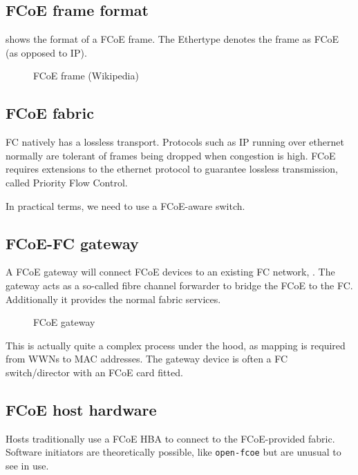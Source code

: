 \subsection{FCoE frame format}\label{fcoe-frame-format}

shows the format of a FCoE frame. The Ethertype denotes the frame as
FCoE (as opposed to IP).

\begin{figure}
\centering
\caption{FCoE frame (Wikipedia){}}
\end{figure}

\subsection{FCoE fabric}\label{fcoe-fabric}

FC natively has a lossless transport. Protocols such as IP running over
ethernet normally are tolerant of frames being dropped when congestion
is high. FCoE requires extensions to the ethernet protocol to guarantee
lossless transmission, called Priority Flow Control.

In practical terms, we need to use a FCoE-aware switch.

\subsection{FCoE-FC gateway}\label{fcoe-fc-gateway}

A FCoE gateway will connect FCoE devices to an existing FC network, .
The gateway acts as a so-called fibre channel forwarder to bridge the
FCoE to the FC. Additionally it provides the normal fabric services.

\begin{figure}
\centering
\caption{FCoE gateway{}}
\end{figure}

This is actually quite a complex process under the hood, as mapping is
required from WWNs to MAC addresses. The gateway device is often a FC
switch/director with an FCoE card fitted.

\subsection{FCoE host hardware}\label{fcoe-host-hardware}

Hosts traditionally use a FCoE HBA to connect to the FCoE-provided
fabric. Software initiators are theoretically possible, like
\texttt{open-fcoe} but are unusual to see in use.

